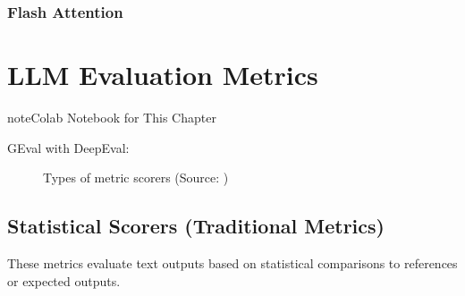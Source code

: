 \documentclass[letterpaper,11pt,english]{sphinxmanual}
\begin{document}
\subsection{Flash Attention}
\label{\detokenize{pretraining:flash-attention}}
\sphinxstepscope


\chapter{LLM Evaluation Metrics}
\label{\detokenize{evaluation:llm-evaluation-metrics}}\label{\detokenize{evaluation:evaluation}}\label{\detokenize{evaluation::doc}}
\begin{sphinxadmonition}{note}{Colab Notebook for This Chapter}

\sphinxAtStartPar
GEval with DeepEval: 
\end{sphinxadmonition}

\begin{figure}[htbp]
\centering
\capstart

\noindent{}
\caption{Types of metric scorers (Source: )}\label{\detokenize{evaluation:id3}}\label{\detokenize{evaluation:fig-metrics-llm}}\end{figure}


\section{Statistical Scorers (Traditional Metrics)}
\label{\detokenize{evaluation:statistical-scorers-traditional-metrics}}
\sphinxAtStartPar
These metrics evaluate text outputs based on statistical comparisons to references
or expected outputs.
\end{document}
